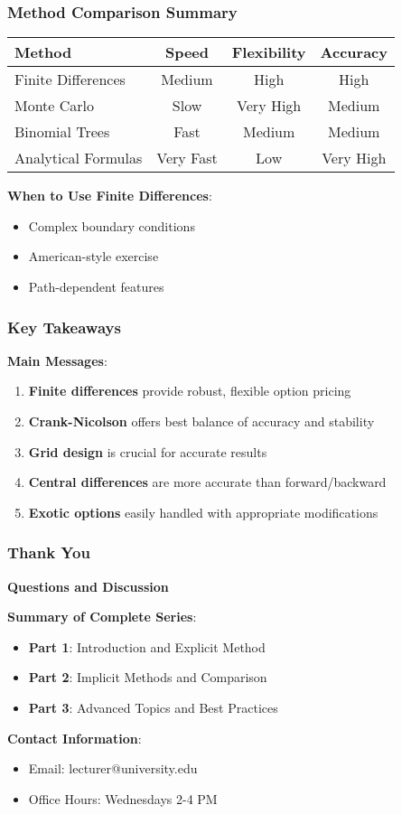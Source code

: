 \documentclass[aspectratio=169]{beamer}
\begin{document}
\begin{frame}
\frametitle{Method Comparison Summary}
\begin{center}
\begin{tabular}{lccc}
\toprule
\textbf{Method} & \textbf{Speed} & \textbf{Flexibility} & \textbf{Accuracy} \\
\midrule
Finite Differences & Medium & High & High \\
Monte Carlo & Slow & Very High & Medium \\
Binomial Trees & Fast & Medium & Medium \\
Analytical Formulas & Very Fast & Low & Very High \\
\bottomrule
\end{tabular}
\end{center}

\textbf{When to Use Finite Differences}:
\begin{itemize}
\item Complex boundary conditions
\item American-style exercise
\item Path-dependent features
\end{itemize}
\end{frame}

\begin{frame}
\frametitle{Key Takeaways}
\textbf{Main Messages}:
\begin{enumerate}
\item \textbf{Finite differences} provide robust, flexible option pricing
\item \textbf{Crank-Nicolson} offers best balance of accuracy and stability  
\item \textbf{Grid design} is crucial for accurate results
\item \textbf{Central differences} are more accurate than forward/backward
\item \textbf{Exotic options} easily handled with appropriate modifications
\end{enumerate}
\end{frame}

\begin{frame}
\frametitle{Thank You}
\textbf{Questions and Discussion}

\vspace{1cm}

\textbf{Summary of Complete Series}:
\begin{itemize}
\item \textbf{Part 1}: Introduction and Explicit Method
\item \textbf{Part 2}: Implicit Methods and Comparison  
\item \textbf{Part 3}: Advanced Topics and Best Practices
\end{itemize}

\vspace{1cm}

\textbf{Contact Information}:
\begin{itemize}
\item Email: lecturer@university.edu
\item Office Hours: Wednesdays 2-4 PM
\end{itemize}
\end{frame}
\end{document}
